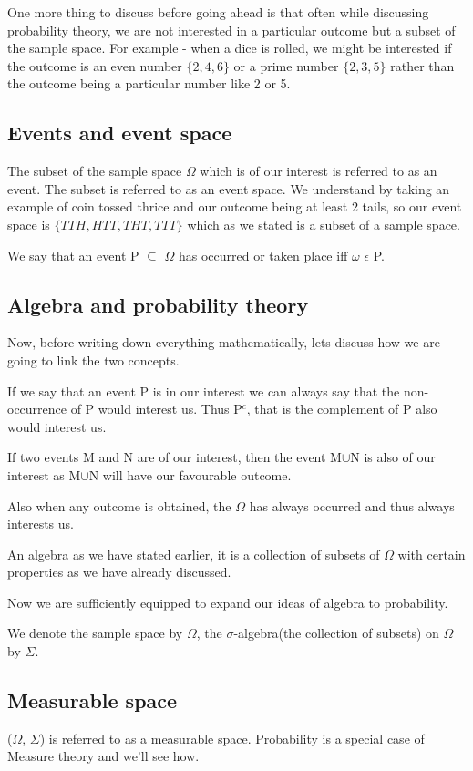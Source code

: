 \documentclass{article}
\begin{document}
One more thing to discuss before going ahead is that often while discussing probability theory, we are not interested in a particular outcome but a subset of the sample space. For example - when a dice is rolled, we might be interested if the outcome is an even number $\{2,4,6\}$ or a prime number $\{2,3,5\}$ rather than the outcome being a particular number like 2 or 5.

\subsection{Events and event space}
The subset of the sample space $\Omega$ which is of our interest is referred to as an event. The subset is referred to as an event space.
We understand by taking an example of coin tossed thrice and our outcome being at least 2 tails, so our event space is $\{TTH, HTT, THT, TTT\}$ which as we stated is a subset of a sample space. 

We say that an event P $\subseteq$ $\Omega$ has occurred or taken place iff $\omega$ $\epsilon$ P.

\subsection{Algebra and probability theory}

Now, before writing down everything mathematically, lets discuss how we are going to link the two concepts.

If we say that an event P is in our interest we can always say that the non-occurrence of P would interest us. Thus P$^{c}$, that is the complement of P also would interest us.

If two events M and N are of our interest, then the event M$\cup$N is also of our interest as  M$\cup$N will have our favourable outcome.

Also when any outcome is obtained, the $\Omega$ has always occurred and thus always interests us.

An algebra as we have stated earlier, it is a collection of subsets of $\Omega$ with certain properties as we have already discussed.

Now we are sufficiently equipped to expand our ideas of algebra to probability.

We denote the sample space by $\Omega$, the $\sigma$-algebra(the collection of subsets) on $\Omega$ by $\Sigma$.

\subsection{Measurable space}
($\Omega$, $\Sigma$) is referred to as a measurable space.
Probability is a special case of Measure theory and we'll see how.
\bigskip
\end{document}
